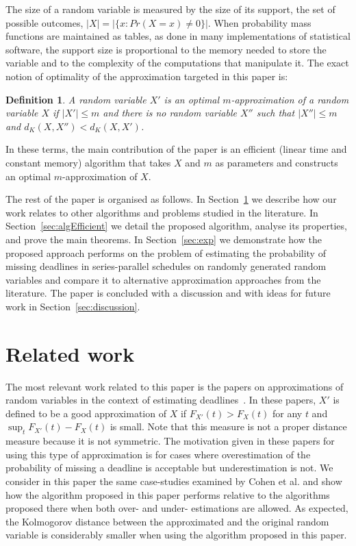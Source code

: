 \documentclass[letterpaper]{article} %
\newtheorem{definition}[thm]{Definition}
\begin{document}
The size of a random variable is measured by the size of its support, the set of possible outcomes, $|X|{=}|\{x\colon Pr(X{=}x) \neq 0\}|$. When probability mass functions are maintained as tables, as done in many implementations of statistical software, the support size is proportional to the memory needed to store the variable and to the complexity of the computations that manipulate it. The exact notion of optimality of the approximation targeted in this paper is:

\begin{definition}
	A random variable $X'$ is an optimal $m$-approximation of a random variable $X$ if $|X'| \leq m$ and there is no random variable $X''$ such that $|X''| \leq m$ and $d_K(X,X'') < d_K(X,X')$.
\end{definition}

In these terms, the main contribution of the paper is an efficient (linear time and constant memory) algorithm that takes $X$ and $m$ as parameters and constructs an optimal $m$-approximation of $X$.

The rest of the paper is organised as follows. In Section~\ref{sec:relwork} we describe how our work relates to other algorithms and problems studied in the literature. In Section~\ref{sec:algEfficient} we detail the proposed algorithm, analyse its properties, and prove the main theorems. In Section~\ref{sec:exp} we demonstrate how the proposed approach performs on the problem of estimating the probability of missing deadlines in series-parallel schedules on randomly generated random variables and compare it to alternative approximation approaches from the literature. The paper is concluded with a discussion and with ideas for future work in Section~\ref{sec:discussion}.

\section{Related work}\label{sec:relwork}
The most relevant work related to this paper is the papers on approximations of random variables in the context of estimating deadlines~\cite{cohen2015estimating,CohenGW18}. In these papers, $X'$ is defined to be a good approximation of $X$ if $F_{X'}(t) > F_{X}(t)$ for any $t$ and $\sup_t F_{X'}(t) - F_{X}(t)$ is small. Note that this measure is not a proper distance measure because it is not symmetric. The motivation given in these papers for using this type of approximation is for cases where overestimation of the probability of missing a deadline is acceptable but underestimation is not. We consider in this paper the same case-studies examined by Cohen et al. and show how the algorithm proposed in this paper performs relative to the algorithms proposed there when both over- and under- estimations are allowed. As expected, the Kolmogorov distance between the approximated and the original random variable is considerably smaller when using the algorithm proposed in this paper. 
\end{document}
